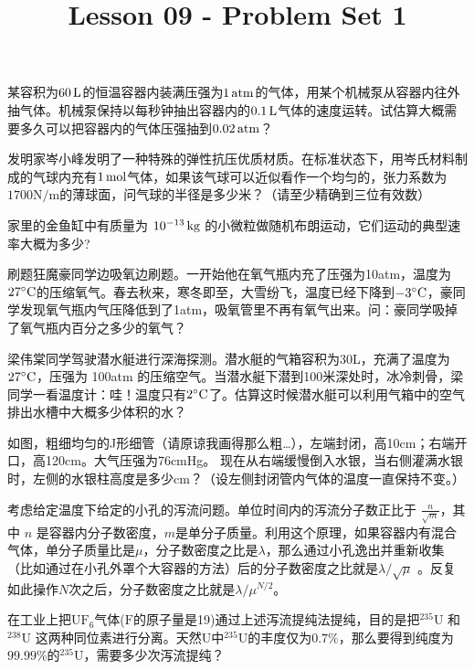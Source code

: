 \documentclass[CJK]{beamer}
\title{Lesson 09 - Problem Set 1}
\author{}
\date{}
\begin{document}

\begin{frame}
  \bchL
  某容积为$60\,\mathrm{L}$的恒温容器内装满压强为$1\,\mathrm{atm}$的气体，用某个机械泵从容器内往外抽气体。机械泵保持以每秒钟抽出容器内的$0.1\,\mathrm{L}$气体的速度运转。试估算大概需要多久可以把容器内的气体压强抽到$0.02\,\mathrm{atm}$？
\echL
\end{frame}


\begin{frame}
  \bchL
发明家岑小峰发明了一种特殊的弹性抗压优质材质。在标准状态下，用岑氏材料制成的气球内充有$1\,\mathrm{mol}$气体，如果该气球可以近似看作一个均匀的，张力系数为$1700\mathrm{N/m}$的薄球面，问气球的半径是多少米？（请至少精确到三位有效数）  
\echL
\end{frame}

\begin{frame}
  \bchL
家里的金鱼缸中有质量为 $10^{-13}\,\mathrm{kg}$ 的小微粒做随机布朗运动，它们运动的典型速率大概为多少?
\echL
\end{frame}

\begin{frame}
  \bchL
刷题狂魔豪同学边吸氧边刷题。一开始他在氧气瓶内充了压强为10atm，温度为$27^\circ \mathrm{C}$的压缩氧气。春去秋来，寒冬即至，大雪纷飞，温度已经下降到$-3^\circ \mathrm{C}$，豪同学发现氧气瓶内气压降低到了1atm，吸氧管里不再有氧气出来。问：豪同学吸掉了氧气瓶内百分之多少的氧气？
\echL
\end{frame}

\begin{frame}
  \bchL
  梁伟棠同学驾驶潜水艇进行深海探测。潜水艇的气箱容积为30L，充满了温度为 $27^\circ \mathrm{C}$，压强为 100atm 的压缩空气。当潜水艇下潜到100米深处时，冰冷刺骨，梁同学一看温度计：哇！温度只有$2^\circ \mathrm{C}$了。估算这时候潜水艇可以利用气箱中的空气排出水槽中大概多少体积的水？
\echL
\end{frame}

\begin{frame}
  \bchL
  如图，粗细均匀的J形细管（请原谅我画得那么粗…），左端封闭，高10cm；右端开口，高120cm。大气压强为76cmHg。
  \emini
  现在从右端缓慢倒入水银，当右侧灌满水银时，左侧的水银柱高度是多少cm？（设左侧封闭管内气体的温度一直保持不变。）
  \emini
  \echL
\end{frame}

\begin{frame}
  \bchl
  考虑给定温度下给定的小孔的泻流问题。单位时间内的泻流分子数正比于 $\frac{n}{\sqrt{m}}$，其中 $n$ 是容器内分子数密度，$m$是单分子质量。利用这个原理，如果容器内有混合气体，单分子质量比是$\mu$，分子数密度之比是$\lambda$，那么通过小孔逸出并重新收集（比如通过在小孔外罩个大容器的方法）后的分子数密度之比就是$\lambda/\sqrt{\mu}$ 。反复如此操作$N$次之后，分子数密度之比就是$\lambda/\mu^{N/2}$。
  
在工业上把$\mathrm{UF}_6$气体($\mathrm{F}$的原子量是19)通过上述泻流提纯法提纯，目的是把$^{235}\mathrm{U}$ 和$^{238}\mathrm{U}$ 这两种同位素进行分离。天然U中$^{235}\mathrm{U}$的丰度仅为$0.7\%$，那么要得到纯度为$99.99\%$的$^{235}\mathrm{U}$，需要多少次泻流提纯？  \echl
\end{frame}
\end{document}
